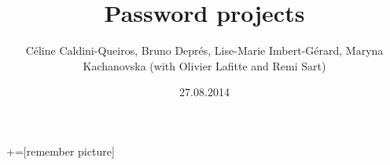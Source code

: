 \documentclass[11 pt]{beamer}
\author[Password team]{Céline Caldini-Queiros, Bruno Deprés, Lise-Marie Imbert-Gérard, Maryna Kachanovska (with Olivier Lafitte and Remi Sart)}
\title[Password]{Password projects}
\institute{Cemracs 2014}
\date{27.08.2014}
\begin{document}

+=[remember picture]





% 	
\end{document}
